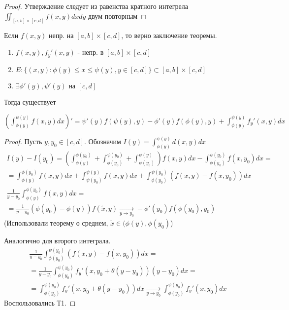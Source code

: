 \documentclass{article}
\begin{document}
\begin{proof}
  Утверждение следует из равенства кратного интегрела $\iint_{[a,b]\times [c,d]}f(x,y)dxdy$ двум повторным
\end{proof}
\begin{remark}
  Если $f(x,y)$ непр. на $[a,b]\times [c,d]$, то верно заключение теоремы.
\end{remark}
\begin{theorem}
  \phantom{.}

  \begin{enumerate}
    \item $f(x,y), f_y'(x,y)$ - непр. в $[a,b]\times [c,d]$
    \item $E:\{(x,y): \phi(y) \le x \le \psi(y), y\in [c,d]\}\subset [a,b]\times [c,d]$
    \item $\exists \phi'(y),\psi'(y)$ на $[c,d]$
  \end{enumerate}
  Тогда существует

  $\left(\int_{\phi(y)}^{\psi(y)}f(x,y)dx\right)'=\psi'(y)f(\psi(y),y)-\phi'(y)f(\phi(y),y)+\int_{\phi(y)}^{\psi(y)}f_y'(x,y)dx$
\end{theorem}
\begin{proof}
  Пусть $y,y_0\in[c,d]$. Обозначим $I(y)=\int_{\phi(y)}^{\psi(y)}d(x,y)dx$
  \begin{gather*}
    I(y)-I(y_0)=(\int_{\phi(y)}^{\phi(y_0)}+\int_{\phi(y_0)}^{\psi(y_0)}+\int_{\psi(y_0)}^{\psi(y)})f(x,y)dx - \int_{\phi(y_0)}^{\psi(y_0)}f(x,y_0)dx = \\ 
    = \int_{\phi(y)}^{\phi(y_0)}f(x,y)dx+\int_{\psi(y_0)}^{\psi(y)}f(x,y)dx+\int_{\phi(y_0)}^{\psi(y_0)}(f(x,y)-f(x,y_0))dx \\ 
    \frac{1}{y-y_0}\int_{\phi(y)}^{\phi(y_0)}f(x,y)dx= \\ 
    = \frac{1}{y-y_0}(\phi(y_0)-\phi(y))f(\tilde{x},y) \underset{y\to y_0}{\to} -\phi'(y_0)f(\phi(y_0), y_0)
  \end{gather*}
  (Использовали теорему о среднем, $\tilde{x} \in (\phi(y), \phi(y_0)$)

  Аналогично для второго интеграла.
  \begin{gather*}
    \frac{1}{y-y_0}\int_{\phi(y_0)}^{\psi(y_0)}(f(x,y)-f(x,y_0))dx= \\ 
     = \frac{1}{y-y_0}\int_{\phi(y_0)}^{\psi(y_0)}f_y'(x,y_0+\theta(y-y_0))(y-y_0)dx = \\ 
     = \int_{\phi(y_0)}^{\psi(y_0)}f_y'(x,y_0+\theta(y-y_0))dx \underset{y\to y_0}{\to}\int_{\phi(y_0)}^{\psi(y_0)}f_y'(x,y_0)dx
  \end{gather*}
  Воспользовались Т1.
\end{proof}
\end{document}
